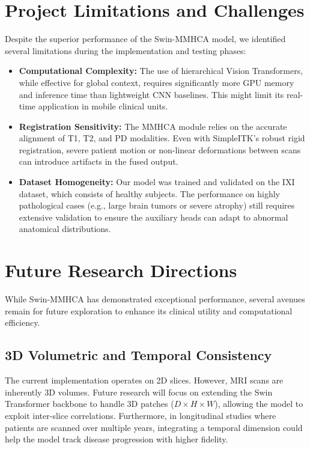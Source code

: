 \section{Project Limitations and Challenges}
Despite the superior performance of the Swin-MMHCA model, we identified several limitations during the implementation and testing phases:
\begin{itemize}
    \item \textbf{Computational Complexity:} The use of hierarchical Vision Transformers, while effective for global context, requires significantly more GPU memory and inference time than lightweight CNN baselines. This might limit its real-time application in mobile clinical units.
    \item \textbf{Registration Sensitivity:} The MMHCA module relies on the accurate alignment of T1, T2, and PD modalities. Even with SimpleITK's robust rigid registration, severe patient motion or non-linear deformations between scans can introduce artifacts in the fused output.
    \item \textbf{Dataset Homogeneity:} Our model was trained and validated on the IXI dataset, which consists of healthy subjects. The performance on highly pathological cases (e.g., large brain tumors or severe atrophy) still requires extensive validation to ensure the auxiliary heads can adapt to abnormal anatomical distributions.
\end{itemize}

\section{Future Research Directions}
While Swin-MMHCA has demonstrated exceptional performance, several avenues remain for future exploration to enhance its clinical utility and computational efficiency.

\subsection{3D Volumetric and Temporal Consistency}
The current implementation operates on 2D slices. However, MRI scans are inherently 3D volumes. Future research will focus on extending the Swin Transformer backbone to handle 3D patches ($D \times H \times W$), allowing the model to exploit inter-slice correlations. Furthermore, in longitudinal studies where patients are scanned over multiple years, integrating a temporal dimension could help the model track disease progression with higher fidelity.

